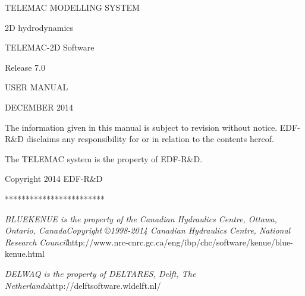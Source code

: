\documentclass{article} %
\begin{document}














 TELEMAC MODELLING SYSTEM













 2D hydrodynamics

  TELEMAC-2D Software

 Release 7.0

 USER MANUAL



 DECEMBER 2014















 The information given in this manual is subject to revision without notice. EDF-R\&D disclaims any responsibility for or in relation to the contents hereof.

 The TELEMAC system is the property of EDF-R\&D.

 Copyright 2014 EDF-R\&D



 ************************







 \textit{BLUEKENUE is the property of the Canadian Hydraulics Centre, Ottawa, Ontario, CanadaCopyright {\copyright}1998-2014 Canadian Hydraulics Centre, National Research Council}http://www.nrc-cnrc.gc.ca/eng/ibp/chc/software/kenue/blue-kenue.html\textit{\underbar{}}

 \textit{}

 \textit{DELWAQ is the property of DELTARES, Delft, The Netherlands}http://delftsoftware.wldelft.nl/\textit{\underbar{}}

 \textit{}

 \textit{}
\end{document}
